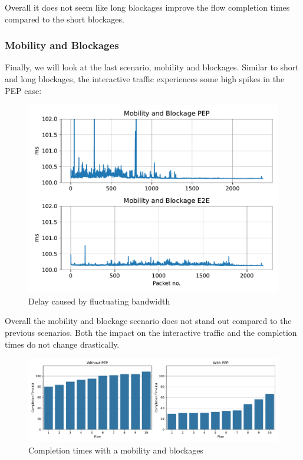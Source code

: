 \documentclass[a4paper,english, 11pt]{report}
\begin{document}
Overall it does not seem like long blockages improve the flow completion times compared to the short blockages. 

\subsubsection{Mobility and Blockages}

Finally, we will look at the last scenario, mobility and blockages. Similar to short and long blockages, the interactive traffic experiences some high spikes in the PEP case:

\begin{figure}[h!] %
	\centering
	\includegraphics[scale=0.50]{../diagrams/witestlab/mobility.pdf}
  	\caption{Delay caused by fluctuating bandwidth}
  	\label{fig:witestlab_graph_delay}
\end{figure}

Overall the mobility and blockage scenario does not stand out compared to the previous scenarios. Both the impact on the interactive traffic and the completion times do not change drastically.

\begin{figure}[h!] %
	\centering
	\includegraphics[scale=0.40]{../diagrams/witestlab/mobb_cubic_bar.pdf}
  	\caption{Completion times with a mobility and blockages}
  	\label{fig:witestlab_mobb_fcts}
\end{figure}
\end{document}
